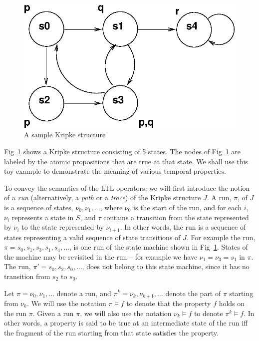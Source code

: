 \begin{figure}[htb]
\centering
\includegraphics[scale=0.6]{../temporal-logics/diag23.eps}
\center
\caption{A sample Kripke structure} \label{fig2.1}
\end{figure}

\noindent
Fig~\ref{fig2.1} shows a Kripke structure consisting of 5 states. 
The nodes of Fig~\ref{fig2.1} are labeled by the atomic propositions
that are true at
that state. We shall use this toy example to demonstrate the meaning of
various temporal properties.

\noindent
To convey the semantics of the LTL operators, we will first
introduce the notion of a {\em run} (alternatively, a {\em path} or a
{\em trace}) of the Kripke structure $J$. A run, $\pi$, of $J$ 
is a sequence of states,
$\nu_0, \nu_1, \ldots$, where $\nu_0$ is the start of the run, and for
each $i$, $\nu_i$ represents a state in $S$, and $\tau$ contains a transition
from the state represented by $\nu_i$ to the state represented by $\nu_{i+1}$.
In other words, the run is a sequence of states representing a valid sequence
of state transitions of $J$. For example the run,
$\pi = s_0, s_1, s_3, s_1, s_4, \ldots$, is one run of the state machine shown
in Fig~\ref{fig2.1}. States of the machine may be revisited in the run -- 
for example we have $\nu_1 = \nu_3 = s_1$ in $\pi$. The run,
$\pi' = s_0, s_2, s_0, \ldots$, does not belong to this state machine, since
it has no transition from $s_2$ to $s_0$.

\noindent
Let $\pi = \nu_0, \nu_1, \ldots$ denote a run, and
$\pi^k = \nu_k, \nu_{k+1}, \ldots$ denote the part of $\pi$ starting from
$\nu_k$. We will use the notation $\pi \models f$ to denote that the property
$f$ holds on the run $\pi$. Given a run $\pi$, we will also use the notation
$\nu_k \models f$ to denote $\pi^k \models f$. In other words, a property is
said to be true at an intermediate state of the run iff the fragment of the 
run starting from that state satisfies the property.

